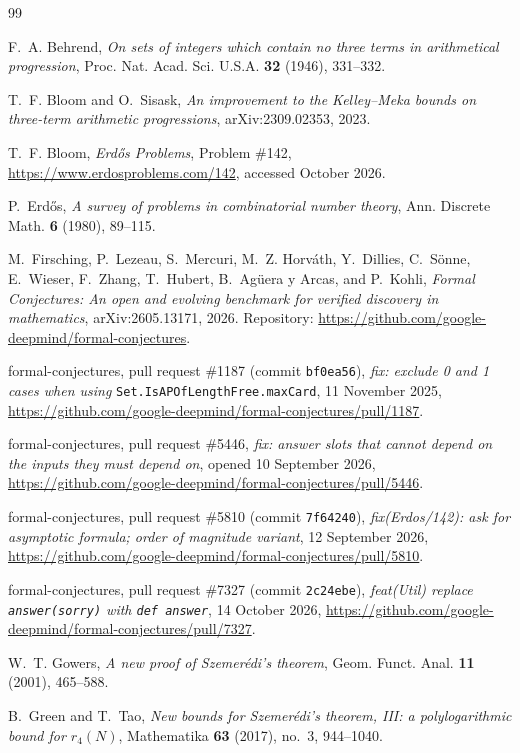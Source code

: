 \documentclass[11pt]{amsart}
\theoremstyle{plain}
\theoremstyle{definition}
\begin{document}
\begin{thebibliography}{99}
\raggedright

F.~A. Behrend, \emph{On sets of integers which contain no three terms in arithmetical progression}, Proc. Nat. Acad. Sci. U.S.A. \textbf{32} (1946), 331--332.

T.~F. Bloom and O.~Sisask, \emph{An improvement to the Kelley--Meka bounds on three-term arithmetic progressions}, arXiv:2309.02353, 2023.

T.~F. Bloom, \emph{Erd\H{o}s Problems}, Problem \#142, \url{https://www.erdosproblems.com/142}, accessed October 2026.

P.~Erd\H{o}s, \emph{A survey of problems in combinatorial number theory}, Ann. Discrete Math. \textbf{6} (1980), 89--115.

M.~Firsching, P.~Lezeau, S.~Mercuri, M.~Z. Horv\'ath, Y.~Dillies, C.~S\"onne, E.~Wieser, F.~Zhang, T.~Hubert, B.~Ag\"uera y Arcas, and P.~Kohli, \emph{Formal Conjectures: An open and evolving benchmark for verified discovery in mathematics}, arXiv:2605.13171, 2026. Repository: \url{https://github.com/google-deepmind/formal-conjectures}.

formal-conjectures, pull request \#1187 (commit \texttt{bf0ea56}), \emph{fix: exclude 0 and 1 cases when using} \texttt{Set.IsAPOfLengthFree.maxCard}, 11 November 2025, \url{https://github.com/google-deepmind/formal-conjectures/pull/1187}.

formal-conjectures, pull request \#5446, \emph{fix: answer slots that cannot depend on the inputs they must depend on}, opened 10 September 2026, \url{https://github.com/google-deepmind/formal-conjectures/pull/5446}.

formal-conjectures, pull request \#5810 (commit \texttt{7f64240}), \emph{fix(Erdos/142): ask for asymptotic formula; order of magnitude variant}, 12 September 2026, \url{https://github.com/google-deepmind/formal-conjectures/pull/5810}.

formal-conjectures, pull request \#7327 (commit \texttt{2c24ebe}), \emph{feat(Util) replace \texttt{answer(sorry)} with \texttt{def answer}}, 14 October 2026, \url{https://github.com/google-deepmind/formal-conjectures/pull/7327}.

W.~T. Gowers, \emph{A new proof of Szemer\'edi's theorem}, Geom. Funct. Anal. \textbf{11} (2001), 465--588.

B.~Green and T.~Tao, \emph{New bounds for Szemer\'edi's theorem, III: a polylogarithmic bound for $r_4(N)$}, Mathematika \textbf{63} (2017), no.~3, 944--1040.


\end{thebibliography}
\end{document}
